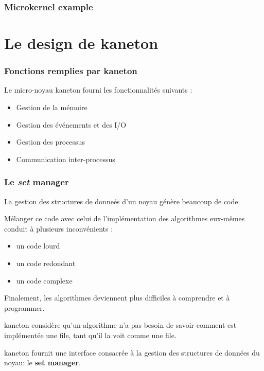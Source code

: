 
\begin{frame}
  \frametitle{Microkernel example}

  \begin{center}
  \end{center}
\end{frame}


%
%

\section{Le design de kaneton}


\begin{frame}
  \frametitle{Fonctions remplies par kaneton}

  Le micro-noyau kaneton fourni les fonctionnalit\'{e}s suivants :

  \begin{itemize}
  \item
    Gestion de la m\'emoire
  \item
    Gestion des \'ev\'enements et des I/O
  \item
    Gestion des processus
  \item
    Communication inter-processus
  \end{itemize}

\end{frame}

\begin{frame}
  \frametitle{Le \emph{set} manager}

La gestion des structures de donne\'es d'un noyau g\'en\`ere beaucoup de code.

M\'elanger ce code avec celui de l'impl\'ementation des algorithmes eux-m\^emes
conduit \`a plusieurs inconv\'enients :

  \begin{itemize}
    \item un code lourd
    \item un code redondant
    \item un code complexe
  \end{itemize}

  \-

  Finalement, les algorithmes deviennent plus difficiles \`a comprendre et \`a
  programmer.

  \-

  kaneton consid\`ere qu'un algorithme n'a pas besoin de savoir comment est
  impl\'ement\'ee une file, tant qu'il la voit comme une file.

  \-

  kaneton fournit une interface consacr\'ee \`a la gestion des structures de
  donn\'ees du noyau: le {\bf set manager}.
\end{frame}

